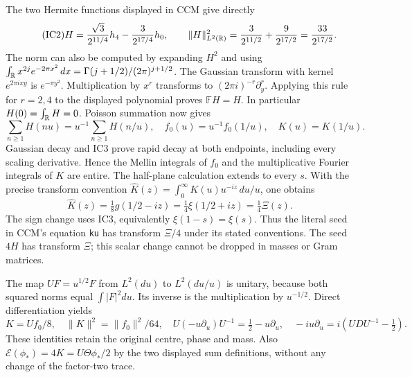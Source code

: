 \documentclass[11pt]{article}
\begin{document}
The two Hermite functions displayed in CCM give directly
\begin{equation}\tag{IC2}
 H=\frac{\sqrt3}{2^{11/4}}h_4-\frac3{2^{17/4}}h_0,
 \qquad \|H\|_{L^2(\mathbb R)}^2=\frac3{2^{11/2}}+\frac9{2^{17/2}}
 =\frac{33}{2^{17/2}}.
\end{equation}
The norm can also be computed by expanding $H^2$ and using
$\int_{\mathbb R}x^{2j}e^{-2\pi x^2}\,dx
=\Gamma(j+1/2)/(2\pi)^{j+1/2}$.
The Gaussian transform with kernel $e^{2\pi ixy}$ is
$e^{-\pi y^2}$. Multiplication by $x^r$ transforms to
$(2\pi i)^{-r}\partial_y^r$. Applying this rule for $r=2,4$
to the displayed polynomial proves $\mathbb FH=H$.
In particular $H(0)=\int_\mathbb R H=0$. Poisson summation now gives
\begin{equation}\tag{IC3}
 \sum_{n\ge1}H(nu)=u^{-1}\sum_{n\ge1}H(n/u),
 \quad f_0(u)=u^{-1}f_0(1/u),\quad K(u)=K(1/u).
\end{equation}
Gaussian decay and IC3 prove rapid decay at both endpoints,
including every scaling derivative. Hence the Mellin integrals
of $f_0$ and the multiplicative Fourier integrals of $K$ are entire.
The half-plane calculation extends to every $s$.
With the precise transform convention
$\widehat K(z)=\int_0^\infty K(u)u^{-iz}\,du/u$, one obtains
\begin{equation}\tag{IC4}
 \widehat K(z)=\tfrac18g(1/2-iz)
 =\tfrac14\xi(1/2+iz)=\tfrac14\Xi(z).
\end{equation}
The sign change uses IC3, equivalently $\xi(1-s)=\xi(s)$.
Thus the literal seed in CCM's equation \texttt{ku} has transform
$\Xi/4$ under its stated conventions. The seed $4H$ has transform
$\Xi$; this scalar change cannot be dropped in masses or Gram matrices.

The map $UF=u^{1/2}F$ from $L^2(du)$ to $L^2(du/u)$ is unitary,
because both squared norms equal $\int|F|^2du$. Its inverse is
the multiplication by $u^{-1/2}$. Direct differentiation yields
\begin{equation}\tag{IC5}
 K=Uf_0/8,\quad \|K\|^2=\|f_0\|^2/64,\quad
 U(-u\partial_u)U^{-1}=\tfrac12-u\partial_u,
 \quad -iu\partial_u=i(U D U^{-1}-\tfrac12).
\end{equation}
These identities retain the original centre, phase and mass.
Also $\mathcal E(\phi_*)=4K=U\Theta\phi_*/2$ by the two displayed
sum definitions, without any change of the factor-two trace.
\end{document}
